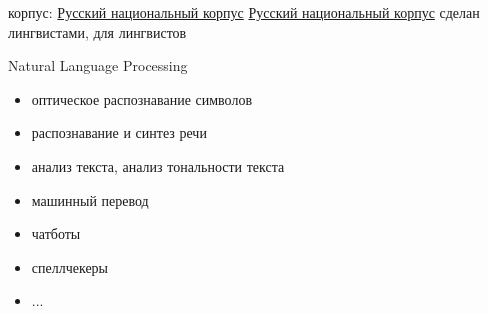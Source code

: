 \documentclass[13pt, t]{beamer}
\begin{document}
\begin{frame}{корпус: \href{http://ruscorpora.ru/}{\color{colorblue} Русский национальный корпус}}
\href{http://ruscorpora.ru/}{\color{colorblue} Русский национальный корпус} сделан лингвистами, для лингвистов 
\end{frame}


\begin{frame}{Natural Language Processing}
\begin{itemize}
\item оптическое распознавание символов
\item распознавание и синтез речи
\item анализ текста, анализ тональности текста
\item машинный перевод
\item чатботы
\item спеллчекеры
\item ...
\end{itemize}
\end{frame}




\end{document}
